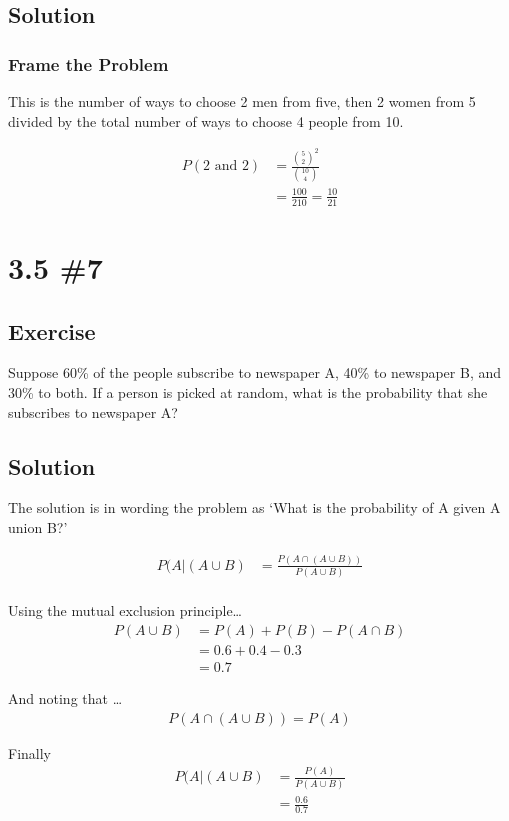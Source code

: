 \documentclass[12pt]{article}
\begin{document}
\subsection{Solution}
\subsubsection{Frame the Problem}\label{ssub:frame_the_problem}
This is the number of ways to choose 2 men from five, then 2 women from 5 divided by the total
number of ways to choose 4 people from 10.

\begin{align*}
  P(\text{2 and 2})&=\frac{\binom{5}{2}^2}{\binom{10}{4}}\\
  &=\frac{100}{210} =\frac{10}{21}
\end{align*}

\section{3.5 \#7} 
\subsection{Exercise}
Suppose 60\% of the people subscribe to newspaper A, 40\% to newspaper B, and 30\% to both. If a person is picked at
random, what is the probability that she subscribes to newspaper A?

\subsection{Solution}
The solution is in wording the problem as `What is the probability of A given A union B?'

\begin{align*}
  P(A|(A\cup B)&= \frac{P(A\cap (A\cup B))}{P(A\cup B)}\\
\end{align*}

Using the mutual exclusion principle\ldots
\begin{align*}
  P(A\cup B) &=P(A) + P(B) - P(A\cap B)\\
             &=0.6 + 0.4 - 0.3\\
             &=0.7
\end{align*}

And noting that \ldots
\begin{align*}
  P(A\cap(A\cup B))=P(A)
\end{align*}

Finally
\begin{align*}
  P(A|(A\cup B)&= \frac{P(A)}{P(A\cup B)}\\
               &= \frac{0.6}{0.7}
\end{align*}
\end{document}
